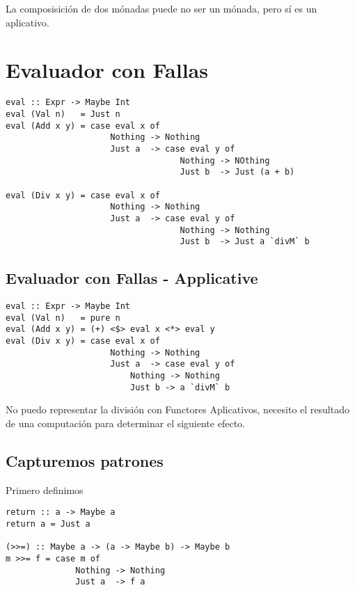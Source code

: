 \documentclass{article}
\begin{document}
La composisición de dos mónadas puede no ser un mónada, pero sí es un aplicativo.

\newpage

\section{Evaluador con Fallas}

\begin{lstlisting}
eval :: Expr -> Maybe Int
eval (Val n)   = Just n
eval (Add x y) = case eval x of
                     Nothing -> Nothing
                     Just a  -> case eval y of
                                   Nothing -> NOthing
                                   Just b  -> Just (a + b)

eval (Div x y) = case eval x of
                     Nothing -> Nothing
                     Just a  -> case eval y of
                                   Nothing -> Nothing
                                   Just b  -> Just a `divM` b
\end{lstlisting}

\subsection{Evaluador con Fallas - Applicative}

\begin{lstlisting}
eval :: Expr -> Maybe Int
eval (Val n)   = pure n
eval (Add x y) = (+) <$> eval x <*> eval y
eval (Div x y) = case eval x of
                     Nothing -> Nothing
                     Just a  -> case eval y of
                         Nothing -> Nothing 
                         Just b -> a `divM` b
\end{lstlisting}

No puedo representar la división con Functores Aplicativos, necesito el resultado de una computación para determinar el siguiente efecto.


\subsection{Capturemos patrones}

Primero definimos

\begin{lstlisting}
return :: a -> Maybe a
return a = Just a

(>>=) :: Maybe a -> (a -> Maybe b) -> Maybe b
m >>= f = case m of
              Nothing -> Nothing
              Just a  -> f a
\end{lstlisting}
\end{document}
